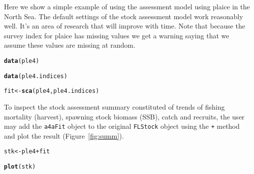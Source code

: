 \documentclass[a4paper,english,10pt]{article}\usepackage[]{graphicx}\usepackage[]{color}
\makeatletter
\newcommand{\hlopt}[1]{\textcolor[rgb]{0,0,0}{#1}}%
\newcommand{\hlstd}[1]{\textcolor[rgb]{0.345,0.345,0.345}{#1}}%
\newcommand{\hlkwb}[1]{\textcolor[rgb]{0.69,0.353,0.396}{#1}}%
\newcommand{\hlkwd}[1]{\textcolor[rgb]{0.737,0.353,0.396}{\textbf{#1}}}%
\newenvironment{kframe}{%
 \def\at@end@of@kframe{}%
 \ifinner\ifhmode%
  \def\at@end@of@kframe{\end{minipage}}%
  \begin{minipage}{\columnwidth}%
 \fi\fi%
 \def\FrameCommand##1{\hskip\@totalleftmargin \hskip-\fboxsep
 \colorbox{shadecolor}{##1}\hskip-\fboxsep
     \hskip-\linewidth \hskip-\@totalleftmargin \hskip\columnwidth}%
 \MakeFramed {\advance\hsize-\width
   \@totalleftmargin\z@ \linewidth\hsize
   \@setminipage}}%
 {\par\unskip\endMakeFramed%
 \at@end@of@kframe}
\newenvironment{knitrout}{}{} %
\newcommand{\code}[1]{{\texttt{#1}}}
\makeatother
\begin{document}
Here we show a simple example of using the assessment model using plaice in the North Sea. The default settings of the stock assessment model work reasonably well. It's an area of research that will improve with time. Note that because the survey index for plaice has missing values we get a warning saying that we assume these values are missing at random.

\begin{knitrout}
\color{fgcolor}\begin{kframe}
\begin{alltt}
\hlkwd{data}\hlstd{(ple4)}
\end{alltt}


{\ttfamily\noindent\color{warningcolor}{\#\# Warning: data set 'ple4' not found}}\begin{alltt}
\hlkwd{data}\hlstd{(ple4.indices)}
\end{alltt}


{\ttfamily\noindent\color{warningcolor}{\#\# Warning: data set 'ple4.indices' not found}}\begin{alltt}
\hlstd{fit} \hlkwb{<-} \hlkwd{sca}\hlstd{(ple4, ple4.indices)}
\end{alltt}


{\ttfamily\noindent\bfseries{}}\end{kframe}
\end{knitrout}

To inspect the stock assessment summary constituted of trends of fishing mortality (harvest), spawning stock biomass (SSB), catch and recruits, the user may add the \code{a4aFit} object to the original \code{FLStock} object using the \code{+} method and plot the result (Figure~\ref{fig:summ}).

\begin{knitrout}
\color{fgcolor}\begin{kframe}
\begin{alltt}
\hlstd{stk} \hlkwb{<-} \hlstd{ple4} \hlopt{+} \hlstd{fit}
\end{alltt}


{\ttfamily\noindent\bfseries\color{errorcolor}{\#\# Error: object 'ple4' not found}}\begin{alltt}
\hlkwd{plot}\hlstd{(stk)}
\end{alltt}


{\ttfamily\noindent\bfseries\color{errorcolor}{\#\# Error: object 'stk' not found}}\end{kframe}
\end{knitrout}
\end{document}
